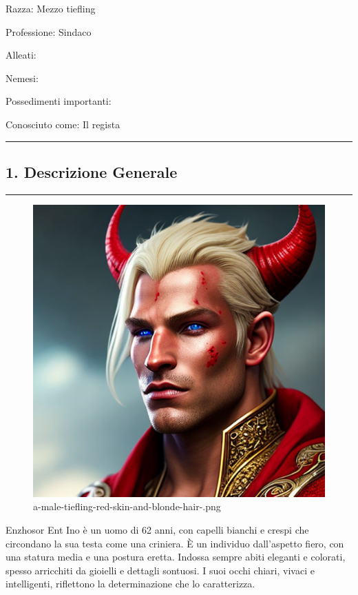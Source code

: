 Razza: Mezzo tiefling

Professione: Sindaco

Alleati:

Nemesi:

Possedimenti importanti:

Conosciuto come: Il regista

\begin{center}\rule{0.5\linewidth}{0.5pt}\end{center}

\subsection{1. Descrizione Generale}\label{descrizione-generale}

\begin{center}\rule{0.5\linewidth}{0.5pt}\end{center}

\begin{figure}
\centering
\includegraphics{a-male-tiefling-red-skin-and-blonde-hair-.png}
\caption{a-male-tiefling-red-skin-and-blonde-hair-.png}
\end{figure}

Enzhosor Ent Ino è un uomo di 62 anni, con capelli bianchi e crespi che
circondano la sua testa come una criniera. È un individuo dall'aspetto
fiero, con una statura media e una postura eretta. Indossa sempre abiti
eleganti e colorati, spesso arricchiti da gioielli e dettagli sontuosi.
I suoi occhi chiari, vivaci e intelligenti, riflettono la determinazione
che lo caratterizza.

